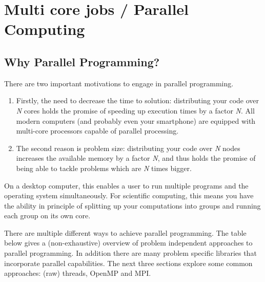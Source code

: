 \chapter{Multi core jobs / Parallel Computing}

\section{Why Parallel Programming?}

There are two important motivations to engage in parallel programming.

\begin{enumerate}
\item  Firstly, the need to decrease the time to solution: distributing your code over \textit{N} cores holds the promise of speeding up execution times by a factor \textit{N}. All modern computers (and probably even your smartphone) are equipped with multi-core processors capable of parallel processing.
\item  The second reason is problem size: distributing your code over \textit{N} nodes increases the available memory by a factor \textit{N}, and thus holds the promise of being able to tackle problems which are \textit{N} times bigger.
\end{enumerate}

On a desktop computer, this enables a user to run multiple programs and the operating system simultaneously. For scientific computing, this means you have the ability in principle of splitting up your computations into groups and running each group on its own core.

There are multiple different ways to achieve parallel programming. The table below gives a (non-exhaustive) overview of problem independent approaches to parallel programming. In addition there are many problem specific libraries that incorporate parallel capabilities. The next three sections explore some common approaches: (raw) threads, OpenMP and MPI.

